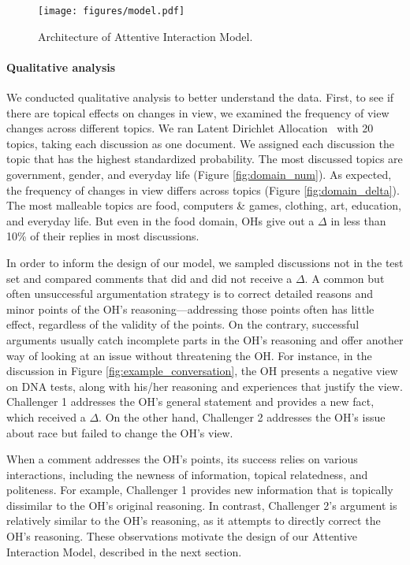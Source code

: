 \documentclass[11pt,a4paper]{article}
\begin{document}
\begin{figure*}[t]
\centering
\texttt{[image: figures/model.pdf]}
\caption{Architecture of Attentive Interaction Model.\label{fig:model}}
\end{figure*}


\paragraph{Qualitative analysis}
We conducted qualitative analysis to better understand the data. First, to see if there are topical effects on changes in view, we examined the frequency of view changes across different topics. We ran Latent Dirichlet Allocation~\cite{Blei:2003tn} with 20 topics, taking each discussion as one document.  We assigned each discussion the topic that has the highest standardized probability. The most discussed topics are government, gender, and everyday life (Figure \ref{fig:domain_num}). As expected, the frequency of changes in view differs across topics (Figure \ref{fig:domain_delta}). The most malleable topics are food, computers \& games, clothing, art, education, and everyday life. But even in the food domain, OHs give out a $\Delta$ in less than 10\% of their replies in most discussions. 

In order to inform the design of our model, we sampled discussions not in the test set and compared comments that did and did not receive a $\Delta$. A common but often unsuccessful argumentation strategy is to correct detailed reasons and minor points of the OH's reasoning---addressing those points often has little effect, regardless of the validity of the points.  On the contrary, successful arguments usually catch incomplete parts in the OH's reasoning and offer another way of looking at an issue without threatening the OH. For instance, in the discussion in Figure \ref{fig:example_conversation}, the OH presents a negative view on DNA tests, along with his/her reasoning and experiences that justify the view. Challenger 1 addresses the OH's general statement and provides a new fact, which received a $\Delta$. On the other hand, Challenger 2 addresses the OH's issue about race but failed to change the OH's view.

When a comment addresses the OH's points,  its success relies on various interactions, including the newness of information, topical relatedness, and politeness. For example, Challenger 1 provides new information that is topically dissimilar to the OH's original reasoning. In contrast, Challenger 2's argument is relatively similar to the OH's reasoning, as it attempts to directly correct the OH's reasoning. These observations motivate the design of our Attentive Interaction Model, described in the next section.
\end{document}
